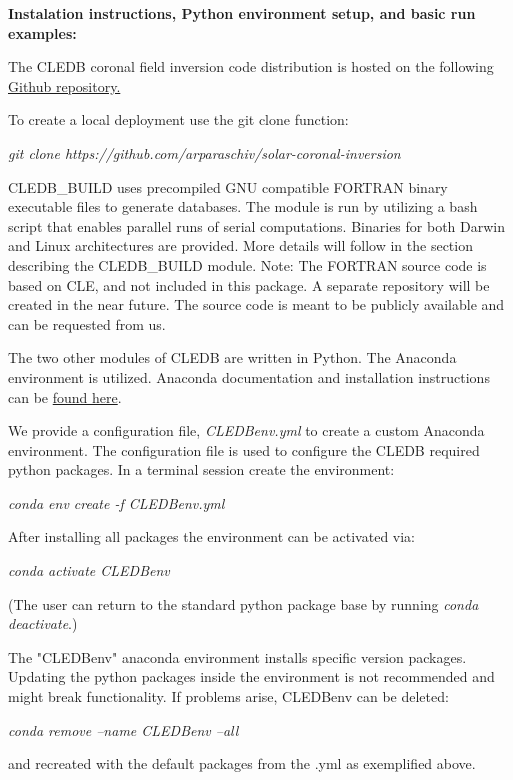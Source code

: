 \documentclass{article}
\begin{document}
\newpage

\textbf{\large Instalation instructions, Python environment setup, and basic run examples:}

The CLEDB coronal field inversion code distribution is hosted on the following \href{https://github.com/arparaschiv/solar-coronal-inversion}{Github repository.} 

To create a local deployment use the git clone function:

\emph{\color{red} git clone https://github.com/arparaschiv/solar-coronal-inversion}

CLEDB\_BUILD uses precompiled GNU compatible FORTRAN binary executable files to generate databases. The module is run by utilizing a bash script that enables parallel runs of serial computations. Binaries for both Darwin and Linux architectures are provided. More details will follow in the section describing the CLEDB\_BUILD module.
Note: The FORTRAN source code is based on CLE, and not included in this package. A separate repository will be created in the near future. The source code is meant to be publicly available and can be requested from us.


The two other modules of CLEDB are written in Python. 
The Anaconda environment is utilized. Anaconda documentation and installation instructions can be \href{https://docs.continuum.io/anaconda/install/}{found here}.

We provide a configuration file, \emph{\color{red}CLEDBenv.yml} to create a custom Anaconda environment. The configuration file is used to configure the CLEDB required python packages. In a terminal session  create the environment:

\emph{\color{red}conda env create -f CLEDBenv.yml}
 
After installing all packages the environment can be activated via:

\emph{\color{red}conda activate CLEDBenv}

(The user can return to the standard python package base by running \emph{\color{red}conda deactivate}.)

The "CLEDBenv" anaconda environment installs specific version packages. Updating the python packages inside the environment is not recommended and might break functionality. If problems arise, CLEDBenv can be deleted:

\emph{\color{red}conda remove --name CLEDBenv --all}

and recreated with the default packages from the .yml as exemplified above.
\end{document}
